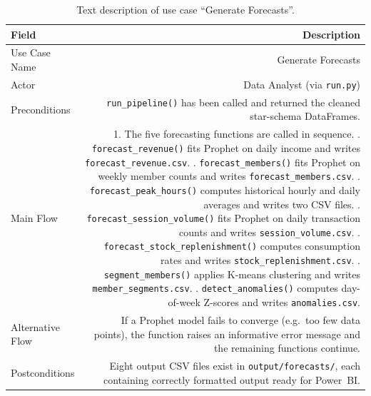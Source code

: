 \documentclass[12pt, a4paper]{report}
\begin{document}
\begin{table}[H]
\centering
\caption{Text description of use case ``Generate Forecasts''.\label{tab:uc_forecast}}
\begin{tabular}{L R}
  \toprule
  \textbf{Field} & \textbf{Description} \\
  \midrule
  Use Case Name  & Generate Forecasts \\
  Actor          & Data Analyst (via \texttt{run.py}) \\
  Preconditions  & \texttt{run\_pipeline()} has been called and returned the
                   cleaned star-schema DataFrames. \\
  Main Flow      & 1. The five forecasting functions are called in sequence. . \texttt{forecast\_revenue()} fits Prophet on daily income
                      and writes \texttt{forecast\_revenue.csv}. . \texttt{forecast\_members()} fits Prophet on weekly member
                      counts and writes \texttt{forecast\_members.csv}. . \texttt{forecast\_peak\_hours()} computes historical hourly
                      and daily averages and writes two CSV files. . \texttt{forecast\_session\_volume()} fits Prophet on daily
                      transaction counts and writes \texttt{session\_volume.csv}. . \texttt{forecast\_stock\_replenishment()} computes consumption
                      rates and writes \texttt{stock\_replenishment.csv}. . \texttt{segment\_members()} applies K-means clustering and
                      writes \texttt{member\_segments.csv}. . \texttt{detect\_anomalies()} computes day-of-week Z-scores
                      and writes \texttt{anomalies.csv}. \\
  Alternative Flow & If a Prophet model fails to converge (e.g.\ too few data points),
                   the function raises an informative error message and the remaining
                   functions continue. \\
  Postconditions & Eight output CSV files exist in \texttt{output/forecasts/},
                   each containing correctly formatted output ready for Power~BI. \\
  \bottomrule
\end{tabular}
\end{table}
\end{document}
